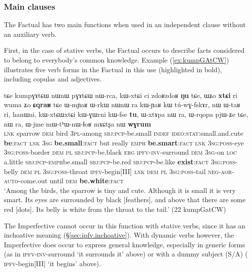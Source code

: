 \subsubsection{Main clauses} \label{sec:fact.main.clauses}
The Factual has two main functions when used in an independent clause without an auxiliary verb. 

First, in the case of stative verbs, the Factual occurs to describe facts considered to belong to everybody's common knowledge. Example (\ref{ex:kumpGAtCW}) illustrates five verb forms in the Factual in this use (highlighted in bold), including copulas and adjectives. 
\largerpage
\begin{exe}
\ex \label{ex:kumpGAtCW}
\gll tɕe kumpɣɤtɕɯ nɯnɯ pɣɤtɕɯ nɯ-rca, kɯ-xtɕi ci zdoʁzdoʁ \textbf{ŋu} tɕe, ɯʑo \textbf{xtɕi} ri wuma ʑo \textbf{ɕqraʁ} tɕe ɯ-mɲaʁ ɯ-rkɯ nɯnɯ ra kɯ-ɲaʁ kɯ tú-wɣ-fskɤr, nɯ ɯ-taʁ ri, hanɯni, kɯ-xtɕɯ\redp{}xtɕi kɯ-ɣɯrni kɯ-fse \textbf{tu}, ɯ-xtɤpa nɯ ra, ɯ-rqopa pjɯ-ʑe tɕe, nɯ ra, ɯ-jme mɯ-tʰɯ-nɯ-ɬoʁ mɤɕtʂa nɯ \textbf{wɣrum}  \\
\textsc{lnk} sparrow \textsc{dem} bird \textsc{3pl}-among \textsc{sbj}:\textsc{pcp}-be.small \textsc{indef} \textsc{ideo}:\textsc{stat}:small.and.cute \textbf{be}:\textsc{fact} \textsc{lnk}  \textsc{3sg} \textbf{be.small}:\textsc{fact} but really \textsc{emph} \textbf{be.smart}:\textsc{fact}  \textsc{lnk}  \textsc{3sg}:\textsc{poss}-eye \textsc{3sg}:\textsc{poss}-border \textsc{dem}  \textsc{pl}  \textsc{sbj}:\textsc{pcp}-be.black \textsc{erg} \textsc{ipfv}-\textsc{inv}-surround \textsc{dem} \textsc{3sg}-on \textsc{loc} a.little \textsc{sbj}:\textsc{pcp}-\textsc{emph}\redp{}be.small \textsc{sbj}:\textsc{pcp}-be.red \textsc{sbj}:\textsc{pcp}-be.like \textbf{exist}:\textsc{fact} \textsc{3sg}:\textsc{poss}-belly \textsc{dem}  \textsc{pl}  \textsc{3sg}:\textsc{poss}-throat \textsc{ipfv}-begin[III] \textsc{lnk}   \textsc{dem}  \textsc{pl}  \textsc{3sg}:\textsc{poss}-tail \textsc{neg}-\textsc{aor}-\textsc{auto}-come.out until \textsc{dem} \textbf{be.white}:\textsc{fact} \\
\glt `Among the birds, the sparrow is tiny and cute. Although it is small it is very smart. Its eyes are surrounded by black [feathers], and above that there are some red [dots]. Its belly is white from the throat to the tail.' (22 kumpGatCW)
\end{exe}

The Imperfective cannot occur in this function with stative verbs, since it has an inchoative meaning (§\ref{sec:ipfv.inchoative}). With dynamic verbs however, the Imperfective does occur to express general knowledge, especially in generic forms (as in   \textsc{ipfv}-\textsc{inv}-surround  `it surrounds it' above)  or with a dummy subject (S/A) ( \textsc{ipfv}-begin[III] `it begins' above). 
 
